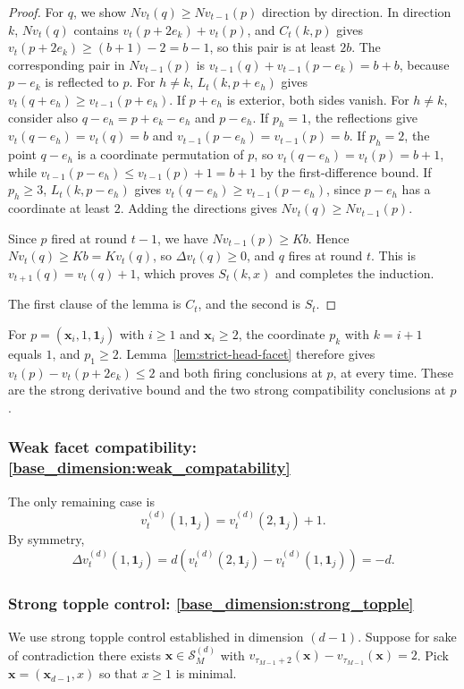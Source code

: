 \documentclass[12pt]{amsart}
\begin{document}
\begin{proof}
For $q$, we show $Nv_t(q)\geq Nv_{t-1}(p)$ direction by direction. In direction $k$, $Nv_t(q)$ contains $v_t(p+2e_k)+v_t(p)$, and $C_t(k,p)$ gives $v_t(p+2e_k)\geq (b+1)-2=b-1$, so this pair is at least $2b$. The corresponding pair in $Nv_{t-1}(p)$ is $v_{t-1}(q)+v_{t-1}(p-e_k)=b+b$, because $p-e_k$ is reflected to $p$. For $h\neq k$, $L_t(k,p+e_h)$ gives $v_t(q+e_h)\geq v_{t-1}(p+e_h)$. If $p+e_h$ is exterior, both sides vanish. For $h\neq k$, consider also $q-e_h=p+e_k-e_h$ and $p-e_h$. If $p_h=1$, the reflections give $v_t(q-e_h)=v_t(q)=b$ and $v_{t-1}(p-e_h)=v_{t-1}(p)=b$. If $p_h=2$, the point $q-e_h$ is a coordinate permutation of $p$, so $v_t(q-e_h)=v_t(p)=b+1$, while $v_{t-1}(p-e_h)\leq v_{t-1}(p)+1=b+1$ by the first-difference bound. If $p_h\geq3$, $L_t(k,p-e_h)$ gives $v_t(q-e_h)\geq v_{t-1}(p-e_h)$, since $p-e_h$ has a coordinate at least $2$. Adding the directions gives $Nv_t(q)\geq Nv_{t-1}(p)$.

Since $p$ fired at round $t-1$, we have $Nv_{t-1}(p)\geq Kb$. Hence $Nv_t(q)\geq Kb=Kv_t(q)$, so $\Delta v_t(q)\geq0$, and $q$ fires at round $t$. This is $v_{t+1}(q)=v_t(q)+1$, which proves $S_t(k,x)$ and completes the induction.

The first clause of the lemma is $C_t$, and the second is $S_t$.
\end{proof}

For $p=(\mathbf{x}_i,1,\mathbf{1}_j)$ with $i\geq1$ and $\mathbf{x}_i\geq2$, the coordinate $p_k$ with $k=i+1$ equals $1$, and $p_1\geq2$. Lemma~\ref{lem:strict-head-facet} therefore gives $v_t(p)-v_t(p+2e_k)\leq 2$ and both firing conclusions at $p$, at every time. These are the strong derivative bound and the two strong compatibility conclusions at $p$.





\subsubsection*{Weak facet compatibility: \eqref{base_dimension:weak_compatability}} \label{subsubsec:higher_weak_facet}
The only remaining case is 
\[
v_t^{(d)}(1, \mathbf{1}_j) = v_{t}^{(d)}(2,\mathbf{1}_j) + 1.
\]
By symmetry, 
\[
\Delta v_t^{(d)}(1, \mathbf{1}_j) = d (v_t^{(d)}(2, \mathbf{1}_j) - v_t^{(d)}(1, \mathbf{1}_j)) = -d.
\]


\subsubsection*{Strong topple control: \eqref{base_dimension:strong_topple}} \label{subsubsec:higher_strong_topple}
We use strong topple control established in dimension $(d-1)$.  Suppose for sake of contradiction 
there exists $\mathbf{x} \in \mathcal{S}_M^{(d)}$ with $v_{\tau_{M-1}+2}(\mathbf{x}) - v_{\tau_{M-1}}(\mathbf{x}) = 2$.
Pick $\mathbf{x} = (\mathbf{x}_{d-1}, x)$ so that $x \geq 1$ is minimal. 
\end{document}
